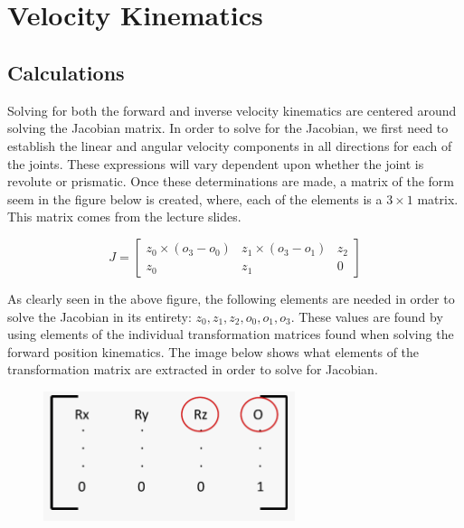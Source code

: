 \documentclass{article}
\title{
    \vspace{2in}
    \textmd{\textbf{\hmwkClass\ \hmwkTitle}}\\
    \vspace{3in}
}
\author{\hmwkAuthorName}
\date{}
\begin{document}
\maketitle

\pagebreak

\section{Velocity Kinematics}

\subsection{Calculations}

Solving for both the forward and inverse velocity kinematics are centered around solving the Jacobian matrix. In order to solve for the Jacobian, we first need to establish the linear and angular velocity components in all directions for each of the joints. These expressions will vary dependent upon whether the joint is revolute or prismatic. Once these determinations are made, a matrix of the form seem in the figure below is created, where, each of the elements is a \(3\times1\) matrix. This matrix comes from the lecture slides. 

\[
    J = \begin{bmatrix}
        z_0 \times (o_3 - o_0) & z_1 \times (o_3 - o_1) & z_2 \\
        z_0 & z_1 & 0
    \end{bmatrix}
\]

As clearly seen in the above figure, the following elements are needed in order to solve the Jacobian in its entirety:
$z_0, z_1, z_2, o_0, o_1, o_3$.  These values are found by using elements of the individual transformation matrices found when solving the forward position kinematics. The image below shows what elements of the transformation matrix are extracted in order to solve for Jacobian. 

\begin{figure}[h]
    \centering
    \includegraphics[scale=0.5]{jacobian_elems.png}
\end{figure}
\end{document}
